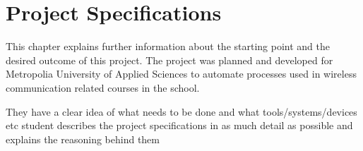 
\chapter{Project Specifications} \label{ch:project_spec}
This chapter explains further information about the starting point and the desired outcome of this project.
The project was planned and developed for Metropolia University of Applied Sciences to automate processes used in wireless communication related courses in the school.

They have 
a clear idea of what needs to be done and what tools/systems/devices etc
student describes the project specifications in as much detail as 
possible and explains the reasoning behind them
\clearpage %
